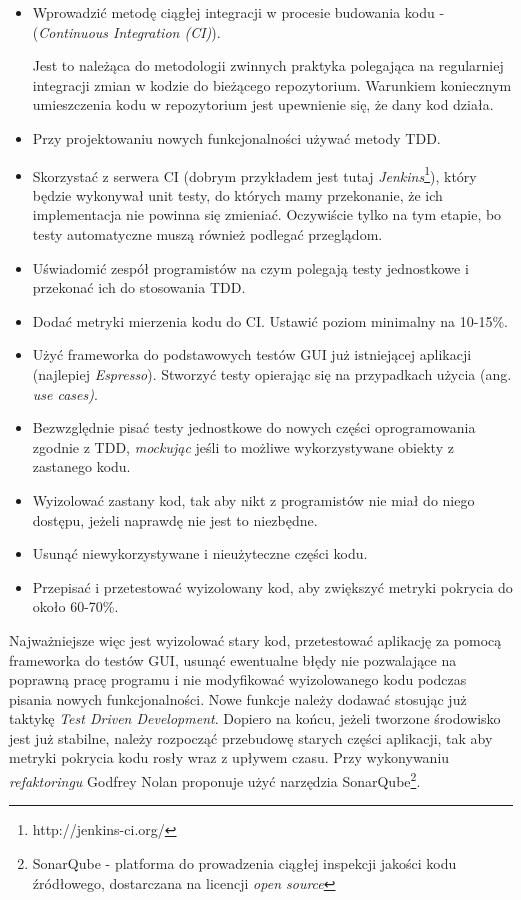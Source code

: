 \begin{itemize}
\item 
Wprowadzić metodę ciągłej integracji w procesie budowania kodu -  (\textit{Continuous Integration (CI)}).

Jest to należąca do metodologii zwinnych praktyka polegająca na regularniej integracji zmian w kodzie do bieżącego repozytorium. Warunkiem koniecznym umieszczenia kodu w repozytorium jest upewnienie się, że dany kod działa.

\item
Przy projektowaniu nowych funkcjonalności używać metody TDD.

\item
Skorzystać z serwera CI (dobrym przykładem jest tutaj \textit{Jenkins}\footnote{http://jenkins-ci.org/}), który będzie wykonywał unit testy, do których mamy przekonanie, że ich implementacja nie powinna się zmieniać. Oczywiście tylko na tym etapie, bo testy automatyczne muszą również podlegać przeglądom.

\item
Uświadomić zespół programistów na czym polegają testy jednostkowe i przekonać ich do stosowania TDD.

\item
Dodać metryki mierzenia kodu do CI. Ustawić poziom minimalny na 10-15\%.

\item
Użyć frameworka do podstawowych testów GUI już istniejącej aplikacji (najlepiej \textit{Espresso}). Stworzyć testy opierając się na przypadkach użycia (ang. \textit{use cases)}.

\item
Bezwzględnie pisać testy jednostkowe do nowych części oprogramowania zgodnie z TDD, \textit{mockując} jeśli to możliwe wykorzystywane obiekty z zastanego kodu.

\item
Wyizolować zastany kod, tak aby nikt z programistów nie miał do niego dostępu, jeżeli naprawdę nie jest to niezbędne.

\item
Usunąć niewykorzystywane i nieużyteczne części kodu.

\item
Przepisać i przetestować wyizolowany kod, aby zwiększyć metryki pokrycia do około 60-70\%. 
\end{itemize}

Najważniejsze więc jest wyizolować stary kod, przetestować aplikację za pomocą frameworka do testów GUI, usunąć ewentualne błędy nie pozwalające na poprawną pracę programu i nie modyfikować wyizolowanego kodu podczas pisania nowych funkcjonalności. Nowe funkcje należy dodawać stosując już taktykę \textit{Test Driven Development}. Dopiero na końcu, jeżeli tworzone środowisko jest już stabilne, należy rozpocząć przebudowę starych części aplikacji, tak aby metryki pokrycia kodu rosły wraz z upływem czasu. Przy wykonywaniu \textit{refaktoringu} Godfrey Nolan proponuje użyć narzędzia SonarQube\footnote{SonarQube - platforma do prowadzenia ciągłej inspekcji jakości kodu źródłowego, dostarczana na licencji \textit{open source}}.